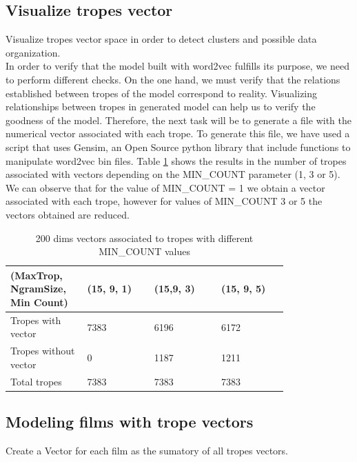 \documentclass[letterpaper]{article}
\begin{document}
	\subsection{Visualize tropes vector}
	
	Visualize tropes vector space in order to detect clusters and possible data organization. \\
	In order to verify that the model built with word2vec fulfills its purpose, we need to perform different checks. On the one hand, 
	we must verify that the relations established between tropes of the model correspond to reality. 
	Visualizing relationships between tropes in generated model can help us to verify the goodness of the model.
	Therefore, the next task will be to generate a file with the numerical vector associated with each trope. 
	To generate this file, we have used a script that uses Gensim, an Open Source python library that include functions to manipulate
	word2vec bin files.
	Table \ref{tab:200dims-vectors-associated-to-tropes} shows the results in the number of tropes associated with vectors depending 
	on the MIN\_COUNT parameter (1, 3 or 5). We can observe that for the value of MIN\_COUNT = 1 we obtain a vector associated with each trope, 
	however for values of MIN\_COUNT 3 or 5 the vectors obtained are reduced. 
	\begin{table}[t]
		\centering
		\begin{tabular}{|p{0.20\linewidth}|p{0.2\linewidth}|p{0.2\linewidth}|p{0.2\linewidth}|}
			\hline
			\textbf{(MaxTrop, NgramSize, Min Count)}& \textbf{(15, 9, 1)} & \textbf{(15,9, 3)} & \textbf{(15, 9, 5)}\\
			\hline
			\hline
			Tropes with vector&7383  & 6196 & 6172 \\
			\hline
			Tropes without vector& 0 & 1187 & 1211 \\
			\hline
			Total tropes&7383&7383&7383\\
			\hline
			
		\end{tabular}
		\caption{200 dims vectors associated to tropes with different MIN\_COUNT values}
		\label{tab:200dims-vectors-associated-to-tropes}
	\end{table}	
	
	\subsection{Modeling films with trope vectors}
	Create a Vector for each film as the sumatory of all tropes vectors. \\
	
\end{document}
